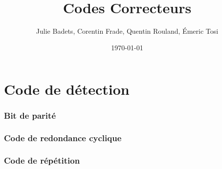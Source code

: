 \documentclass[a4paper,10pt]{report}
\title{Codes Correcteurs}
\author{Julie Badets, Corentin Frade, Quentin Rouland, Émeric Tosi}
\date{\today}
\begin{document}
    \maketitle{}

    \tableofcontents{}

    \part{Code de détection}
        \section[VRC]{Bit de parité}

        \section[CRC]{Code de redondance cyclique}

        \section{Code de répétition}
\end{document}
